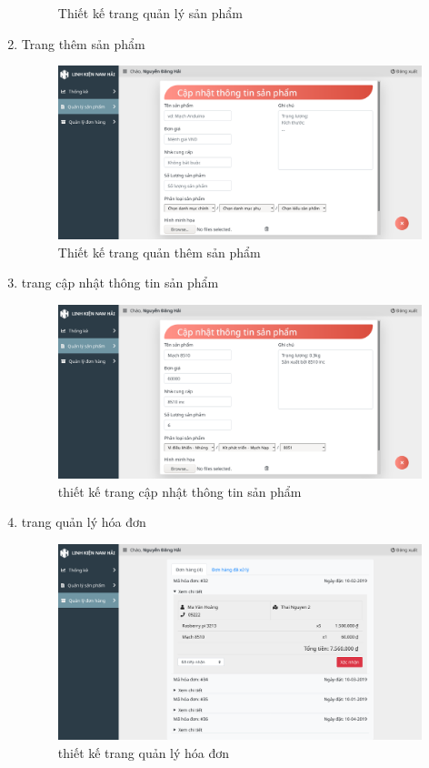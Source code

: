 \begin{enumerate}[label=\textbf{\alph*)}]
\begin{figure}[h!]
		      \caption{Thiết kế trang quản lý sản phẩm}
	      \end{figure}
          \newpage
	\item Trang thêm sản phẩm
	      \begin{figure}[h!]
		      \centering
		      \includegraphics[width=\linewidth]{fig/r_manage_product_add_product.png}
		      \caption{Thiết kế trang quản thêm sản phẩm}
	      \end{figure}
	\item trang cập nhật thông tin sản phẩm
	      \begin{figure}[h!]
		      \centering
		      \includegraphics[width=\linewidth]{fig/r_manage_product_update_product.png}
		      \caption{thiết kế trang cập nhật thông tin sản phẩm}
	      \end{figure}
          \newpage
	\item trang quản lý hóa đơn
	      \begin{figure}[h!]
		      \centering
		      \includegraphics[width=\linewidth]{fig/r_order.png}
		      \caption{thiết kế trang quản lý hóa đơn}
	      \end{figure}
          \newpage
\end{enumerate}

